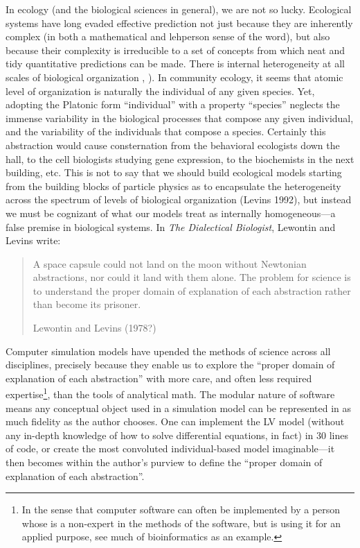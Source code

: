 \documentclass[]{article}
\begin{document}
In ecology (and the biological sciences in general), we are not so
lucky. Ecological systems have long evaded effective prediction not just
because they are inherently complex (in both a mathematical and
lehperson sense of the word), but also because their complexity is
irreducible to a set of concepts from which neat and tidy quantitative
predictions can be made. There is internal heterogeneity at all scales
of biological organization \citep{levins_lewontin},
\citep{levin}). In community ecology, it seems that atomic level of
organization is naturally the individual of any given species. Yet,
adopting the Platonic form ``individual'' with a property ``species''
neglects the immense variability in the biological processes that
compose any given individual, and the variability of the individuals
that compose a species. Certainly this abstraction would cause
consternation from the behavioral ecologists down the hall, to the cell
biologists studying gene expression, to the biochemists in the next
building, etc. This is not to say that we should build ecological models
starting from the building blocks of particle physics as to encapsulate
the heterogeneity across the spectrum of levels of biological
organization (Levins 1992), but instead we must be cognizant of what our
models treat as internally homogeneous---a false premise in biological
systems. In \emph{The Dialectical Biologist}, Lewontin and Levins write:

\begin{quote}
A space capsule could not land on the moon without Newtonian
abstractions, nor could it land with them alone. The problem for science
is to understand the proper domain of explanation of each abstraction
rather than become its prisoner.

Lewontin and Levins (1978?)
\end{quote}

Computer simulation models have upended the methods of science across
all disciplines, precisely because they enable us to explore the
``proper domain of explanation of each abstraction'' with more care, and
often less required expertise\footnote{In the sense that computer
  software can often be implemented by a person whose is a non-expert in
  the methods of the software, but is using it for an applied purpose,
  see much of bioinformatics as an example.}, than the tools of
analytical math. The modular nature of software means any conceptual
object used in a simulation model can be represented in as much fidelity
as the author chooses. One can implement the LV model (without any
in-depth knowledge of how to solve differential equations, in fact) in
30 lines of code, or create the most convoluted individual-based model
imaginable---it then becomes within the author's purview to define the
``proper domain of explanation of each abstraction''.
\end{document}

